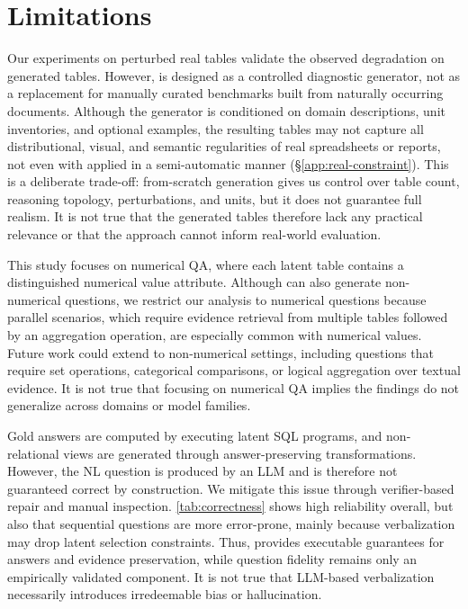 \section{Limitations} 
\label{sec:limitations}
\vspace{-1ex}
Our experiments on perturbed real tables validate the observed degradation on generated tables. However, \name is designed as a controlled diagnostic generator, not as a replacement for manually curated benchmarks built from naturally occurring documents.
Although the generator is conditioned on domain descriptions, unit inventories, and optional examples, the resulting tables may not capture all distributional, visual, and semantic regularities of real spreadsheets or reports, not even with \name applied in a semi-automatic manner (\S\ref{app:real-constraint}).
This is a deliberate trade-off: from-scratch generation gives us control over table count, reasoning topology, perturbations, and units, but it does not guarantee full realism.
It is not true that the generated tables therefore lack any practical relevance or that the approach cannot inform real-world evaluation.

 This study focuses on numerical QA, where each latent table contains a distinguished numerical value attribute. Although \name{} can also generate non-numerical questions, we restrict our analysis to numerical questions because parallel scenarios, which require evidence retrieval from multiple tables followed by an aggregation operation, are especially common with numerical values. Future work could extend \name{} to non-numerical settings, including questions that require set operations, categorical comparisons, or logical aggregation over textual evidence.
It is not true that focusing on numerical QA implies the findings do not generalize across domains or model families.

Gold answers are computed by executing latent SQL programs, and non-relational views are generated through answer-preserving transformations.
However, the NL question is produced by an LLM and is therefore not guaranteed correct by construction. We mitigate this issue through verifier-based repair and manual inspection.
\autoref{tab:correctness} shows high reliability overall, but also that sequential questions are more error-prone, mainly because verbalization may drop latent selection constraints. Thus, \name provides executable guarantees for answers and evidence preservation, while question fidelity remains only an empirically validated component.
It is not true that LLM-based verbalization necessarily introduces irredeemable bias or hallucination.

